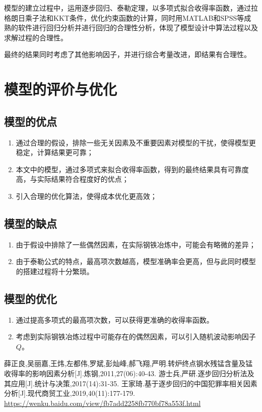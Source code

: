 \documentclass[12pt]{article}%
\begin{document}
模型的建立过程中，运用逐步回归、泰勒定理，以多项式拟合收得率函数，通过拉格朗日乘子法和KKT条件，优化约束函数的计算，同时用MATLAB和SPSS等成熟的软件进行回归分析并进行回归的合理性分析，体现了模型设计中算法过程以及求解过程的合理性。

最终的结果同时考虑了其他影响因子，并进行综合考量改进，即结果有合理性。
\section{模型的评价与优化}
\subsection{模型的优点}
\begin{enumerate}[1.]\addtolength{\itemsep}{-1.5ex}
\item 通过合理的假设，排除一些无关因素及不重要因素对模型的干扰，使得模型更稳定，计算结果更可靠；
\item 本文中的模型，通过多项式来拟合收得率函数，得到的最终结果具有可靠度高，与实际结果符合程度好的优点；
\item 引入合理的优化算法，使得成本优化更高效；
\end{enumerate}
\subsection{模型的缺点}
\begin{enumerate}[1.]\addtolength{\itemsep}{-1.5ex}
\item 由于假设中排除了一些偶然因素，在实际钢铁冶炼中，可能会有略微的差异；
\item 由于泰勒公式的特点，最高项次数越高，模型准确率会更高，但与此同时模型的搭建过程将十分繁琐。
\end{enumerate}
\subsection{模型的优化}
\begin{enumerate}[1.]\addtolength{\itemsep}{-1.5ex}
\item 通过提高多项式的最高项次数，可以获得更准确的收得率函数。
\item 考虑到实际钢铁冶炼过程中可能存在的偶然因素，可以引入随机波动影响因子$Q$。
\end{enumerate}

\begin{thebibliography}{15}\addtolength{\itemsep}{-2.5ex}
 薛正良,吴丽嘉,王炜,左都伟,罗斌,彭灿峰,郝飞翔,严明.转炉终点钢水残锰含量及锰收得率的影响因素分析[J].炼钢,2011,27(06):40-43.
游士兵,严研.逐步回归分析法及其应用[J].统计与决策,2017(14):31-35.
王家琦.基于逐步回归的中国犯罪率相关因素分析[J].现代商贸工业,2019,40(11):177-179.
 \url{https://wenku.baidu.com/view/fb7add2258fb770bf78a553f.html}
\end{thebibliography}
\renewcommand\appendix{\setcounter{secnumdepth}{-2}}
\appendix
{}
\end{document}
